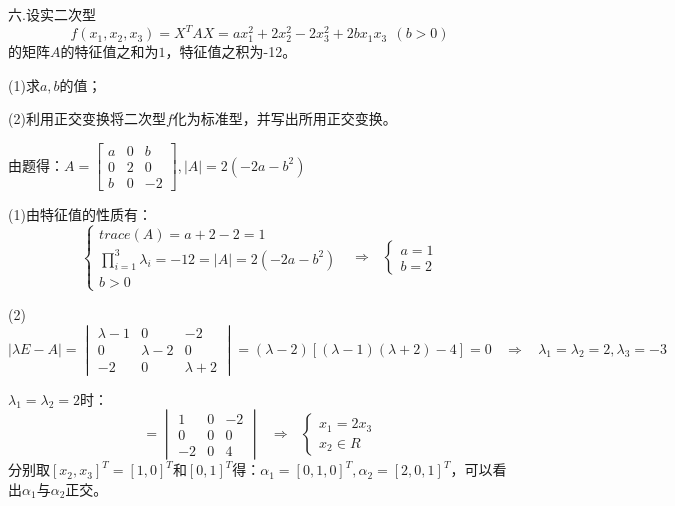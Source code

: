 \documentclass{article}
\begin{document}
六.设实二次型
\begin{equation*}
  f(x_{1},x_{2},x_{3})=X^{T}AX=ax_{1}^{2}+2x_{2}^{2}-2x_{3}^{2}+2bx_{1}x_{3}~~(b>0)
\end{equation*}
的矩阵$A$的特征值之和为$1$，特征值之积为-12。

(1)求$a,b$的值；

(2)利用正交变换将二次型$f$化为标准型，并写出所用正交变换。

\begin{jie}
由题得：$A=
\begin{bmatrix}
  a & 0 & b\\
  0 & 2 & 0\\
  b & 0 & -2
\end{bmatrix},|A|=2(-2a-b^2)
$

(1)由特征值的性质有：
\begin{equation*}
\begin{cases}
trace(A)=a+2-2=1\\
\prod\limits_{i=1}^{3}\lambda_i=-12=|A|=2(-2a-b^2)\\
b>0
\end{cases}~~~\Rightarrow~~~
\begin{cases}
a=1\\
b=2
\end{cases}
\end{equation*}

(2)
\begin{equation*}
  |\lambda E-A|=
  \begin{vmatrix}
  \lambda-1& 0 & -2\\
  0 & \lambda-2 & 0\\
  -2 & 0 & \lambda+2
  \end{vmatrix}=(\lambda-2)[(\lambda-1)(\lambda+2)-4]=0~~~~\Rightarrow~~~~\lambda_1=\lambda_2=2,\lambda_3=-3
\end{equation*}

$\lambda_1=\lambda_2=2$时：
\begin{equation*}
  [\lambda E-A]=
  \begin{vmatrix}
  1& 0 & -2\\
  0 & 0 & 0\\
  -2 & 0 & 4
  \end{vmatrix}~~~\Rightarrow~~~
  \begin{cases}
   x_1=2x_3\\
   x_2\in R
  \end{cases}
\end{equation*}
分别取$[x_2,x_3]^T=[1,0]^T$和$[0,1]^T$得：$\alpha_1=[0,1,0]^T,\alpha_{2}=[2,0,1]^T$，可以看出$\alpha_1$与$\alpha_2$正交。


\end{jie}
\end{document}
